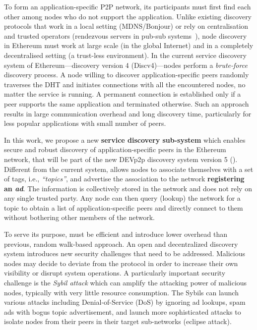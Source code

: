  To form an application-specific P2P network, its participants must first find each other among nodes who do not support the application. 
Unlike existing discovery protocols that work in a local setting (MDNS/Bonjour) or rely on centralisation and trusted operators (\eg rendezvous servers in pub-sub systems~\cite{}), node discovery in Ethereum must work at large scale (in the global Internet) and in a completely decentralised setting  (\ie a trust-less environment). 
In the current service discovery system of Ethereum---\ie discovery version 4 (Discv4)---nodes perform a \textit{brute-force} discovery process. 
A node willing to discover application-specific peers randomly traverses the DHT and initiates connections with all the encountered nodes, no matter the service is running.
A permanent connection is established only if a peer supports the same application and terminated otherwise. 
Such an approach results in large communication overhead and long discovery time, particularly for less popular applications with small number of peers.


 In this work, we propose a new \textbf{service discovery sub-system} which enables secure and robust discovery of application-specific peers in the Ethereum network,  that will be part of the new DEVp2p  discovery system version 5 (\textit{\sysname}).
 Different from the current system, \sysname allows nodes to associate themselves with a set of tags, i.e., \textit{``topics''}, and advertise the association to the network \ie  \textbf{registering an \emph{ad}}. The information is collectively stored in the network and does not rely on any single trusted party. Any node can then query (\ie lookup) the network for a topic to obtain a list of application-specific peers and directly connect to them without bothering other members of the network. 

To serve its purpose, \sysname must be efficient and introduce lower overhead than previous, random walk-based approach. An open and decentralized discovery system introduces new security challenges that need to be addressed. Malicious nodes may decide to deviate from the protocol in order to increase their own visibility or disrupt system operations. A particularly important security challenge is the \textit{Sybil attack} which can amplify the attacking power of malicious nodes, typically with very little resource consumption. The Sybils can launch various attacks including Denial-of-Service (DoS) by ignoring ad lookups, spam ads with bogus topic advertisement, and launch more sophisticated attacks to isolate nodes from their peers in their target sub-networks (\ie eclipse attack). 

